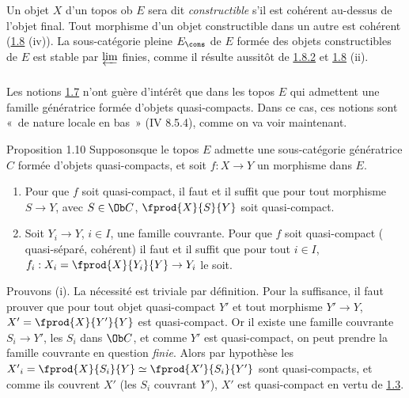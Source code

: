 \subsubsection{}
Un objet $X$ d'un  topos ob $E$ sera dit \emph{constructible} s'il est
cohérent au-dessus de l'objet final. Tout morphisme d'un objet
constructible dans un autre est cohérent (\hyperref[VI.prop1.8]{1.8} (iv)). La sous-catégorie
pleine $E_{\cons}$ de $E$ formée des objets constructibles de $E$ est
stable par $\varprojlim$ finies, comme il résulte aussitôt de \hyperref[VI.cor1.8.2]{1.8.2} et
\hyperref[VI.prop1.8]{1.8} (ii).

\subsubsection{}
Les notions \hyperref[VI.def1.7]{1.7} n'ont guère d'intérêt que dans
les topos $E$ qui
admettent une famille génératrice formée d'objets
quasi-compacts. Dans
ce cas, ces notions sont « de nature locale en bas » (IV 8.5.4),
comme on va voir maintenant.

\begin{enonce*}{Proposition 1.10}
Supposons\pageoriginale que le topos $E$ admette une sous-catégorie
génératrice $C$ formée d'objets quasi-compacts, et soit $f : X \to Y$ un morphisme
  dans $E$.
\begin{enumerate}
\renewcommand{\theenumi}{\roman{enumi}}
\renewcommand{\labelenumi}{(\theenumi)}
\item Pour que $f$ soit quasi-compact, il faut et il suffit que pour
  tout morphisme $S \to Y$, avec $S \in \Ob C$, $\fprod{X}{S}{Y}$ soit
  quasi-compact.

\item Soit $Y_i \to Y$, $i \in I$, une famille couvrante. Pour que $f$
  soit quasi-compact (\emph{\resp} quasi-séparé, \emph{\resp}
  cohérent) il faut et il suffit que pour tout $i \in I$, $f_i : X_i = \fprod{X}{Y_i}{Y}
  \to Y_i$ le soit.
\end{enumerate}
\end{enonce*}

Prouvons (i). La nécessité est triviale par définition.
Pour la suffisance, il faut prouver que pour tout objet quasi-compact
$Y'$ et tout morphisme $Y'\to Y$, $X'= \fprod{X}{Y'}{Y}$ est
quasi-compact. Or il existe une famille couvrante $S_i \to Y'$, les
$S_i$ dans $\Ob C$, et comme $Y'$ est quasi-compact, on peut prendre la
famille couvrante en question \emph{finie}. Alors par hypothèse les
${X'}_i = \fprod{X}{S_i}{Y} \simeq \fprod{X'}{S_i}{Y'}$ sont
quasi-compacts, et comme ils couvrent $X'$ (les $S_i$ couvrant $Y'$),
$X'$ est quasi-compact en vertu de \hyperref[VI.prop1.3]{1.3}.

